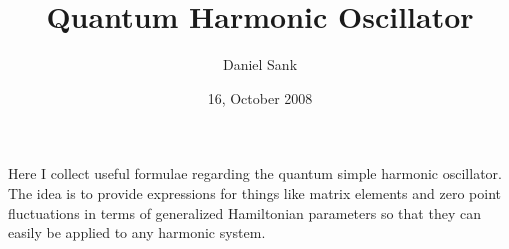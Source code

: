 \documentclass{article}
\title{Quantum Harmonic Oscillator}
\author{Daniel Sank}
\date{16, October 2008}
\begin{document}
\maketitle

Here I collect useful formulae regarding the quantum simple harmonic oscillator.
The idea is to provide expressions for things like matrix elements and zero point fluctuations in terms of generalized Hamiltonian parameters so that they can easily be applied to any harmonic system.







\end{document}
